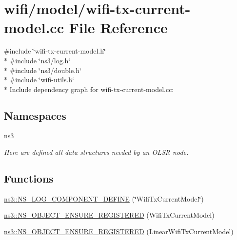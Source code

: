 \hypertarget{wifi-tx-current-model_8cc}{}\section{wifi/model/wifi-\/tx-\/current-\/model.cc File Reference}
\label{wifi-tx-current-model_8cc}
{\ttfamily \#include \char`\"{}wifi-\/tx-\/current-\/model.\+h\char`\"{}}\\*
{\ttfamily \#include \char`\"{}ns3/log.\+h\char`\"{}}\\*
{\ttfamily \#include \char`\"{}ns3/double.\+h\char`\"{}}\\*
{\ttfamily \#include \char`\"{}wifi-\/utils.\+h\char`\"{}}\\*
Include dependency graph for wifi-\/tx-\/current-\/model.cc\+:
\subsection*{Namespaces}
\begin{DoxyCompactItemize}
\item 
 \hyperlink{namespacens3}{ns3}
\begin{DoxyCompactList}\small\item\em Here are defined all data structures needed by an O\+L\+SR node. \end{DoxyCompactList}\end{DoxyCompactItemize}
\subsection*{Functions}
\begin{DoxyCompactItemize}
\item 
\hyperlink{namespacens3_a7d0ed01e2d71abe057e8c36f9cd47a4f}{ns3\+::\+N\+S\+\_\+\+L\+O\+G\+\_\+\+C\+O\+M\+P\+O\+N\+E\+N\+T\+\_\+\+D\+E\+F\+I\+NE} (\char`\"{}Wifi\+Tx\+Current\+Model\char`\"{})
\item 
\hyperlink{namespacens3_a61b9bc374ba9211ce650650f14772c78}{ns3\+::\+N\+S\+\_\+\+O\+B\+J\+E\+C\+T\+\_\+\+E\+N\+S\+U\+R\+E\+\_\+\+R\+E\+G\+I\+S\+T\+E\+R\+ED} (Wifi\+Tx\+Current\+Model)
\item 
\hyperlink{namespacens3_a0f4620ed4747c5731b07f00a7b487614}{ns3\+::\+N\+S\+\_\+\+O\+B\+J\+E\+C\+T\+\_\+\+E\+N\+S\+U\+R\+E\+\_\+\+R\+E\+G\+I\+S\+T\+E\+R\+ED} (Linear\+Wifi\+Tx\+Current\+Model)
\end{DoxyCompactItemize}
